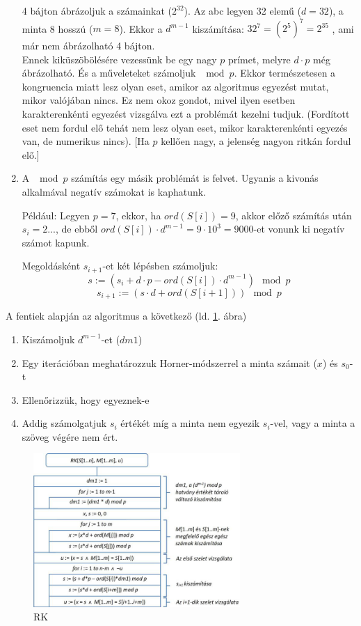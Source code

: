 \documentclass[margin=0px]{article}
\begin{document}
\begin{enumerate}
    4 bájton ábrázoljuk a számainkat ($2^{32}$). Az abc legyen 32 elemű ($d=32$), a minta 8 hosszú ($m=8$). Ekkor a $d^{m-1}$ kiszámítása: $32^7 = (2^5)^7 = 2^{35}$ , ami már nem ábrázolható 4 bájton.\\
				
    \noindent Ennek kiküszöbölésére vezessünk be egy nagy $p$ prímet, melyre $d\cdot p$ még ábrázolható. És a műveleteket számoljuk $\mod{p}$. Ekkor természetesen a kongruencia miatt lesz olyan eset, amikor az algoritmus egyezést mutat, mikor valójában nincs. Ez nem okoz gondot, mivel ilyen esetben karakterenkénti egyezést vizsgálva ezt a problémát kezelni tudjuk. (Fordított eset nem fordul elő tehát nem lesz olyan eset, mikor karakterenkénti egyezés van, de numerikus nincs). [Ha $p$ kellően nagy, a jelenség nagyon ritkán fordul elő.]
				
	\item A $\mod{p}$ számítás egy másik problémát is felvet. Ugyanis a kivonás alkalmával negatív számokat is kaphatunk.
				
	Például: Legyen $p=7$, ekkor, ha $ord(S[i]) = 9$, akkor előző számítás után $s_i = 2...$, de ebből $ord(S[i])\cdot d^{m-1} = 9\cdot 10^3 = 9000$-et vonunk ki negatív számot kapunk.
				
				Megoldásként $s_{i+1}$-et két lépésben számoljuk:
				\[s := (s_i+d\cdot p - ord(S[i])\cdot d^{m-1}) \mod{p} \]
				\[s_{i+1} := (s\cdot d + ord(S[i+1])) \mod{p} \]
			\end{enumerate}			
			A fentiek alapján az algoritmus a következő (ld. \ref{fig:RK}. ábra)
			\begin{enumerate}
				\item Kiszámoljuk $d^{m-1}$-et ($dm1$)
				\item Egy iterációban meghatározzuk Horner-módszerrel a minta számait ($x$) és $s_0$-t
				\item Ellenőrizzük, hogy egyeznek-e
				\item Addig számolgatjuk $s_i$ értékét míg a minta nem egyezik $s_i$-vel, vagy a minta a szöveg végére nem ért.
			\end{enumerate}
			\begin{figure}[H]
				\centering
				\includegraphics[width=0.7\textwidth]{img/Rabin_Krap_algo.png}
				\caption{RK}
				\label{fig:RK}
			\end{figure}
\end{document}
